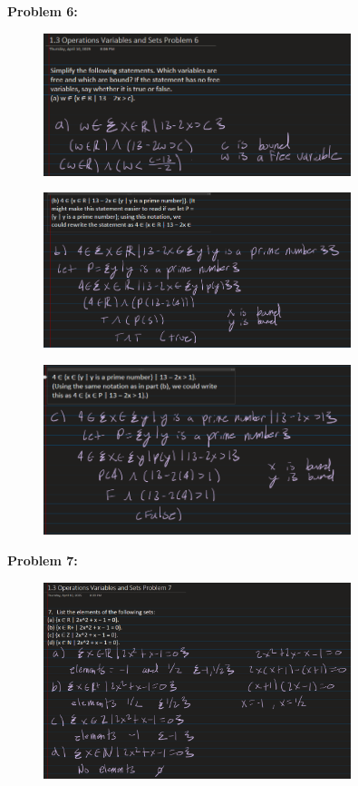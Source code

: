 \textbf{Problem 6:}
\begin{figure}[H]
    \centering
    \includegraphics[width=0.8\textwidth]{images/1.2/21.PNG}
\end{figure}
\begin{figure}[H]
    \centering
    \includegraphics[width=0.8\textwidth]{images/1.2/22.PNG}
\end{figure}
\begin{figure}[H]
    \centering
    \includegraphics[width=0.8\textwidth]{images/1.2/23.PNG}
\end{figure}

\textbf{Problem 7:}
\begin{figure}[H]
    \centering
    \includegraphics[width=0.8\textwidth]{images/1.2/24.PNG}
\end{figure}

